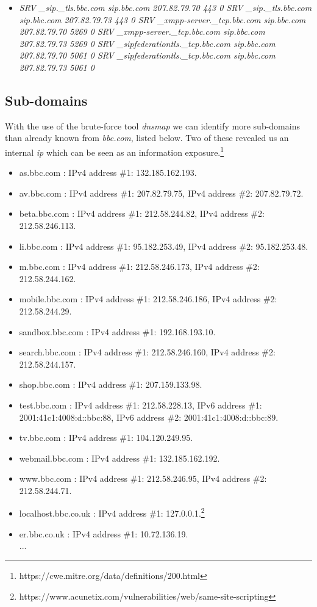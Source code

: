 \documentclass[conference]{IEEEtran}
\begin{document}
 \begin{itemize}
\item\textit{SRV \_sip.\_tls.bbc.com sip.bbc.com 207.82.79.70 443 0
SRV \_sip.\_tls.bbc.com sip.bbc.com 207.82.79.73 443 0
SRV \_xmpp-server.\_tcp.bbc.com sip.bbc.com 207.82.79.70 5269 0
SRV \_xmpp-server.\_tcp.bbc.com sip.bbc.com 207.82.79.73 5269 0
SRV \_sipfederationtls.\_tcp.bbc.com sip.bbc.com 207.82.79.70 5061 0
SRV \_sipfederationtls.\_tcp.bbc.com sip.bbc.com 207.82.79.73 5061 0}
 \end{itemize}
 
 \subsection{Sub-domains}
 With the use of the brute-force tool \textit{dnsmap} we can identify more sub-domains than already known from \textit{bbc.com}, listed below. Two of these revealed us an internal \textit{ip} which can be seen as an information exposure.\footnote{https://cwe.mitre.org/data/definitions/200.html}
 \begin{itemize}
     \item as.bbc.com : IPv4 address \#1: 132.185.162.193.
     \item av.bbc.com : IPv4 address \#1: 207.82.79.75, IPv4 address \#2: 207.82.79.72.
     \item beta.bbc.com : IPv4 address \#1: 212.58.244.82, IPv4 address \#2: 212.58.246.113.
     \item li.bbc.com : IPv4 address \#1: 95.182.253.49, IPv4 address \#2: 95.182.253.48.
     \item m.bbc.com : IPv4 address \#1: 212.58.246.173, IPv4 address \#2: 212.58.244.162.
     \item mobile.bbc.com : IPv4 address \#1: 212.58.246.186, IPv4 address \#2: 212.58.244.29.
     \item sandbox.bbc.com : IPv4 address \#1: 192.168.193.10. 
     \item search.bbc.com : IPv4 address \#1: 212.58.246.160, IPv4 address \#2: 212.58.244.157.
     \item shop.bbc.com : IPv4 address \#1: 207.159.133.98.
     \item test.bbc.com : IPv4 address \#1: 212.58.228.13, IPv6 address \#1: 2001:41c1:4008:d::bbc:88, IPv6 address \#2: 2001:41c1:4008:d::bbc:89.
     \item tv.bbc.com : IPv4 address \#1: 104.120.249.95.
     \item webmail.bbc.com : IPv4 address \#1: 132.185.162.192.
     \item www.bbc.com : IPv4 address \#1: 212.58.246.95, IPv4 address \#2: 212.58.244.71.
     \item localhost.bbc.co.uk : IPv4 address \#1: 127.0.0.1.\footnote{https://www.acunetix.com/vulnerabilities/web/same-site-scripting}
     \item er.bbc.co.uk : IPv4 address \#1: 10.72.136.19.\\
     ... 
 \end{itemize}
\end{document}
